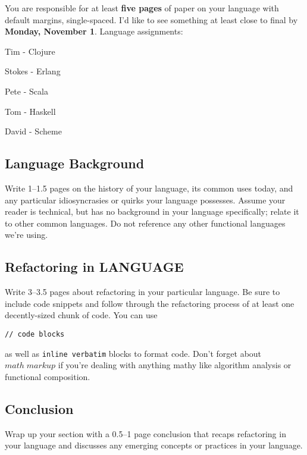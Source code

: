 \documentclass{article}
\begin{document}

You are responsible for at least \textbf{five pages} of paper on your language with default margins, single-spaced. I'd like to see something at least close to final by \textbf{Monday, November 1}. Language assignments:

\begin{itemize*}
\item Tim - Clojure
\item Stokes - Erlang
\item Pete - Scala
\item Tom - Haskell
\item David - Scheme
\end{itemize*}

\subsection*{Language Background}

Write 1--1.5 pages on the history of your language, its common uses today, and any particular idiosyncrasies or quirks your language possesses. Assume your reader is technical, but has no background in your language specifically; relate it to other common languages. Do not reference any other functional languages we're using.

\subsection*{Refactoring in LANGUAGE}

Write 3--3.5 pages about refactoring in your particular language. Be sure to include code snippets and follow through the refactoring process of at least one decently-sized chunk of code. You can use

\begin{verbatim}
// code blocks
\end{verbatim}

as well as \verb!inline verbatim! blocks to format code. Don't forget about $math \; markup$ if you're dealing with anything mathy like algorithm analysis or functional composition.

\subsection*{Conclusion}

Wrap up your section with a 0.5--1 page conclusion that recaps refactoring in your language and discusses any emerging concepts or practices in your language.
\end{document}
